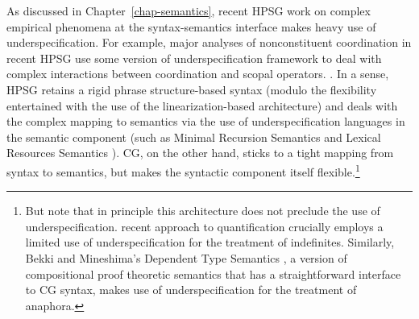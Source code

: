 \documentclass[output=paper]{langsci/langscibook}
\begin{document}



As discussed in Chapter~\ref{chap-semantics}, recent HPSG work on complex empirical
phenomena at the syntax-semantics interface makes heavy use of
underspecification. For example, major
analyses of nonconstituent coordination in recent HPSG use some
version of underspecification framework to deal with complex
interactions between coordination and scopal operators.
\citep{Yatabe2001a,BS2004a,parkea18gapping,yatabe-tam2017}. In a sense, HPSG retains a
rigid phrase structure-based syntax (modulo the flexibility
entertained with the use of the linearization-based architecture) and
deals with the complex mapping to semantics 
via the use of underspecification languages in the semantic
component (such as Minimal Recursion Semantics \citep{CFPS2005a} and
Lexical Resources Semantics \citep{RS2004a-u}). 
CG, on the other hand, sticks to a tight mapping from syntax to
semantics, but makes the syntactic component itself
flexible.\footnote{But note that in principle this architecture does
not preclude the use of underspecification.  recent
approach to quantification crucially employs a limited use of
underspecification for the treatment of indefinites. Similarly, Bekki
and Mineshima's Dependent Type Semantics \citep{bekki14,bekkimineshima17},
a version of compositional
proof theoretic semantics that has a straightforward interface to CG
syntax, makes use of underspecification for the treatment of
anaphora.}
\end{document}
